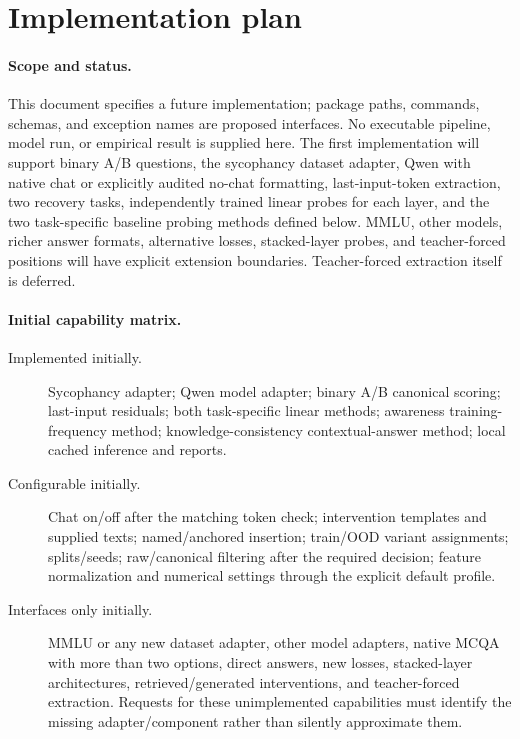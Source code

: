 \documentclass[11pt]{article}
\begin{document}
\section{Implementation plan}

\paragraph{Scope and status.}
This document specifies a future implementation; package paths, commands, schemas, and exception names are proposed interfaces.
No executable pipeline, model run, or empirical result is supplied here.
The first implementation will support binary A/B questions, the sycophancy dataset adapter, Qwen with native chat or explicitly audited no-chat formatting, last-input-token extraction, two recovery tasks, independently trained linear probes for each layer, and the two task-specific baseline probing methods defined below.
MMLU, other models, richer answer formats, alternative losses, stacked-layer probes, and teacher-forced positions will have explicit extension boundaries.
Teacher-forced extraction itself is deferred.

\paragraph{Initial capability matrix.}
\begin{description}
\item[Implemented initially.] Sycophancy adapter; Qwen model adapter; binary A/B canonical scoring; last-input residuals; both task-specific linear methods; awareness training-frequency method; knowledge-consistency contextual-answer method; local cached inference and reports.
\item[Configurable initially.] Chat on/off after the matching token check; intervention templates and supplied texts; named/anchored insertion; train/OOD variant assignments; splits/seeds; raw/canonical filtering after the required decision; feature normalization and numerical settings through the explicit default profile.
\item[Interfaces only initially.] MMLU or any new dataset adapter, other model adapters, native MCQA with more than two options, direct answers, new losses, stacked-layer architectures, retrieved/generated interventions, and teacher-forced extraction.
Requests for these unimplemented capabilities must identify the missing adapter/component rather than silently approximate them.
\end{description}
\end{document}

